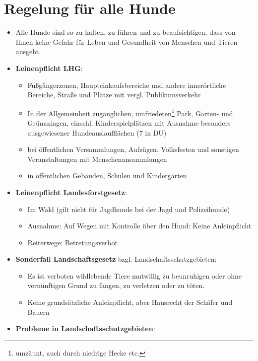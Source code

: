 \clearpage
\section{Regelung für alle Hunde}
    \begin{itemize}
        \item Alle Hunde sind so zu halten, zu führen und zu beaufsichtigen, dass von Ihnen keine Gefahr für Leben und Gesundheit von Menschen und Tieren ausgeht.
        \item \textbf{Leinenpflicht LHG}:
        \begin{itemize}
             \item Fußgängerzonen, Haupteinkaufsbereiche und andere innerörtliche Bereiche, Straße und Plätze mit vergl. Publikumsverkehr
             \item In der Allgemeinheit zugänglichen, umfriedeten\footnote{\glqq umzäunt\grqq{}, auch durch niedrige Hecke etc.} Park, Garten- und Grünanlagen, einschl. Kinderspielplätzen mit Ausnahme besonders ausgewiesener Hundeauslaufflächen (7 in DU)
             \item bei öffentlichen Versammlungen, Aufzügen, Volksfesten und sonstigen Veranstaltungen mit Menschenansammlungen
             \item in öffentlichen Gebäuden, Schulen und Kindergärten
         \end{itemize}
         \item \textbf{Leinenpflicht Landesforstgesetz}:
         \begin{itemize}
             \item Im Wald (gilt nicht für Jagdhunde bei der Jagd und Polizeihunde)
             \item Ausnahme: Auf Wegen mit \glqq Kontrolle\grqq{} über den Hund: Keine Anleinpflicht
             \item Reiterwege: Betretungsverbot
         \end{itemize}
         \item \textbf{Sonderfall Landschaftsgesetz} bzgl. Landschaftsschutzgebieten:
         \begin{itemize}
             \item Es ist verboten wildlebende Tiere mutwillig zu beunruhigen oder ohne vernünftigen Grund zu fangen, zu verletzen oder zu töten.
             \item Keine grundsätzliche Anleinpflicht, aber Hausrecht der Schäfer und Bauern
         \end{itemize}
         \item \textbf{Probleme in Landschaftsschutzgebieten}:

\end{itemize}
